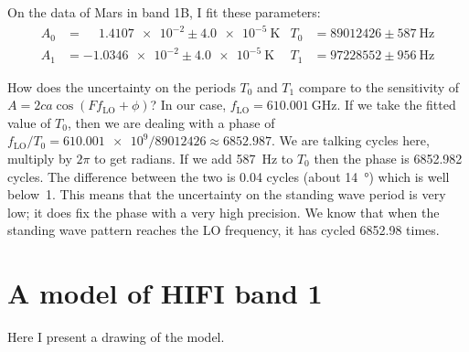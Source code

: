 On the data of Mars in band 1B, I fit these parameters:
\begin{align*}
    A_0 &= \phantom{-}\num{1.4107e-2} \pm \SI{4.0e-5}{\kelvin}
    &
    T_0 &= \num{89012426} \pm \SI{587}{\hertz}
    \\
    A_1 &= \num{-1.0346e-2} \pm \SI{4.0e-5}{\kelvin}
    &
    T_1 &= \num{97228552} \pm \SI{956}{\hertz}
\end{align*}

How does the uncertainty on the periods $T_0$ and $T_1$ compare to the sensitivity of $A = 2ca \cos(F f_\text{LO} + \phi)$?
In our case, $f_\text{LO} = \SI{610.001}{\giga\hertz}$.
If we take the fitted value of $T_0$, then we are dealing with a phase of
$f_\text{LO} / T_0 = \num{610.001e9} / \num{89012426} \approx \num{6852.987}$.
We are talking cycles here, multiply by $2\pi$ to get radians.
If we add \SI{587}{\hertz} to $T_0$ then the phase is \num{6852.982} cycles.
The difference between the two is 0.04 cycles (about \SI{14}{\degree}) which is well below~1.
This means that the uncertainty on the standing wave period is very low; it does fix the phase with a very high precision.
We know that when the standing wave pattern reaches the LO frequency, it has cycled 6852.98 times.


\section{A model of HIFI band 1}
Here I present a drawing of the model.
